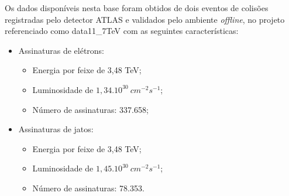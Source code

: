 Os dados disponíveis nesta base foram obtidos de dois eventos de colisões registradas pelo detector ATLAS e validados pelo ambiente \textit{offline}, no projeto referenciado como data11\_7TeV com as seguintes características:

	\begin{itemize}
		\item Assinaturas de elétrons:
		\begin{itemize}
			\item Energia por feixe de 3,48 TeV;
			\item Luminosidade de $1,34.10^{30} \ {cm^{-2}s^{-1}}$;
			\item Número de assinaturas: 337.658;
		\end{itemize}
		\item Assinaturas de jatos:
		\begin{itemize}
			\item Energia por feixe de 3,48 TeV;
			\item Luminosidade de $1,45.10^{30} \ {cm^{-2}s^{-1}}$;
			\item Número de assinaturas: 78.353.
		\end{itemize}
	\end{itemize}



%
%
%


